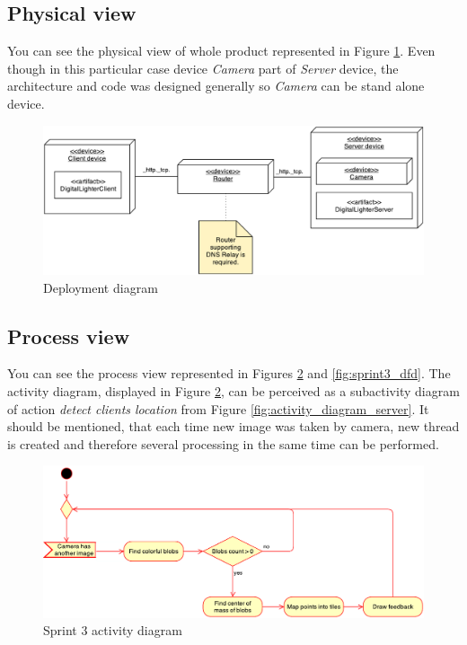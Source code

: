 \subsection{Physical view}
You can see the physical view of whole product represented in Figure \ref{fig:sprint3_deployment_diagram}.
Even though in this particular case device \emph{Camera} part of \emph{Server} device, the architecture and code was designed generally so \emph{Camera} can be stand alone device.

\begin{figure}[h]
	\centering
		\includegraphics[width=15cm]{images/deployment-diagram-sprint3}
	\caption{Deployment diagram}
	\label{fig:sprint3_deployment_diagram}
\end{figure}

\subsection{Process view}
You can see the process view represented in Figures \ref{fig:sprint3_activity_diagram} and \ref{fig:sprint3_dfd}. The activity diagram, displayed in Figure \ref{fig:sprint3_activity_diagram}, can be perceived as a subactivity diagram of action \emph{detect clients location} from Figure \ref{fig:activity_diagram_server}.
It should be mentioned, that each time new image was taken by camera, new thread is created and therefore several processing in the same time can be performed.

\begin{figure}[h]
	\centering
		\includegraphics[width=16.2cm]{sprint3/activity_sprint3.pdf}
	\caption{Sprint 3 activity diagram}
	\label{fig:sprint3_activity_diagram}
\end{figure}


